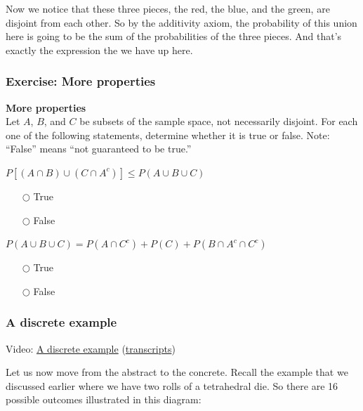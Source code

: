 \documentclass[pdftex, brazil, 12pt, twoside]{article}
\begin{document}
Now we notice that these three pieces, the red, the blue, and
the green, are disjoint from each other.
So by the additivity axiom, the probability of this union
here is going to be the sum of the probabilities
of the three pieces.
And that's exactly the expression
the we have up here.

\subsubsection{Exercise: More properties}
\label{un1-lec1-exec-more-properties}

\begin{exercise}
  \textbf{More properties}\\
  Let $A$, $B$, and $C$ be subsets of the sample space, not necessarily disjoint.
  For each one of the following statements, determine whether it is true or false.
  Note: ``False'' means ``not guaranteed to be true.''

  $P\left[(A \cap B) \cup (C \cap A^c)\right] \le P(A \cup B \cup C)$
  \begin{itemize}[noitemsep]
  \item[$\bigcirc$] True
  \item[$\bigcirc$] False
  \end{itemize}

  $P(A \cup B \cup C) = P(A \cap C^c) + P(C) + P(B \cap A^c \cap C^c)$
  \begin{itemize}[noitemsep]
  \item[$\bigcirc$] True
  \item[$\bigcirc$] False
  \end{itemize}
\end{exercise}

\subsubsection{A discrete example}
\label{un1-lec1-discrete-example}

Video: \href{https://www.youtube.com/watch?v=MqHBUGcvpGI}{A discrete example}
(\href{Unit-1/01\_lecture\_1\_probability\_models\_and\_axioms/l01\_6\_transcripts.pdf}{transcripts})

Let us now move from the abstract to the concrete.
Recall the example that we discussed earlier where we
have two rolls of a tetrahedral die.
So there are 16 possible outcomes
illustrated in this diagram:
\end{document}
